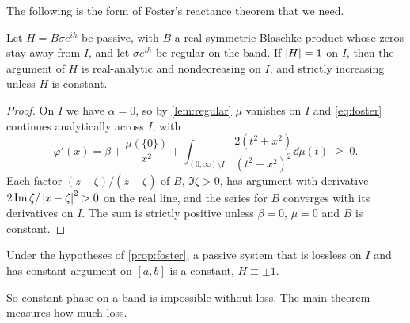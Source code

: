 The following is the form of Foster's reactance theorem \cite{foster} that we
need.

\begin{proposition}\label{prop:foster}
Let $H=B\sigma e^{ih}$ be passive, with $B$ a real-symmetric Blaschke
product whose zeros stay away from $I$, and let $\sigma e^{ih}$ be regular on
the band. If $\left|H\right|=1$ on $I$, then the argument of $H$ is real-analytic
and nondecreasing on $I$, and strictly increasing unless $H$ is constant.
\end{proposition}

\begin{proof}
On $I$ we have $\alpha=0$, so by \cref{lem:regular} $\mu$ vanishes on $I$
and \eqref{eq:foster} continues analytically across $I$, with
\[
\varphi'(x)=\beta+\frac{\mu(\{0\})}{x^2}+\int_{(0,\infty)\setminus I}
\frac{2(t^2+x^2)}{(t^2-x^2)^2}\dd\mu(t)\;\ge\;0 .
\]
Each factor $(z-\zeta)/(z-\bar\zeta)$ of $B$, $\Im\zeta>0$, has argument with
derivative $2\operatorname{Im}\zeta/\left|x-\zeta\right|^2>0$ on the real line, and the series for
$B$ converges with its derivatives on $I$. The sum is strictly positive
unless $\beta=0$, $\mu=0$ and $B$ is constant.
\end{proof}

\begin{corollary}\label{cor:rigid}
Under the hypotheses of \cref{prop:foster}, a passive system that is
lossless on $I$ and has constant argument on $[a,b]$ is a constant,
$H\equiv\pm1$.
\end{corollary}

So constant phase on a band is impossible without loss. The main theorem
measures how much loss.
